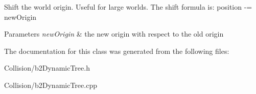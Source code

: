 Shift the world origin. Useful for large worlds. The shift formula is\+: position -\/= new\+Origin 
\begin{DoxyParams}{Parameters}
{\em new\+Origin} & the new origin with respect to the old origin \\
\hline
\end{DoxyParams}


The documentation for this class was generated from the following files\+:\begin{DoxyCompactItemize}
\item 
Collision/b2\+Dynamic\+Tree.\+h\item 
Collision/b2\+Dynamic\+Tree.\+cpp\end{DoxyCompactItemize}

